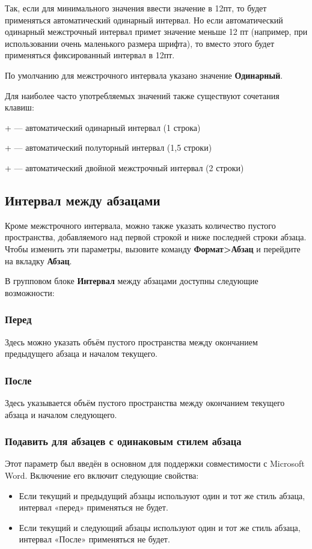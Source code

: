 ﻿\documentclass[a4paper,10pt]{article}
\begin{document}
\begin{itemize}
Так, если для минимального значения ввести значение в 12пт, то будет применяться автоматический одинарный интервал. Но если автоматический одинарный межстрочный интервал примет значение меньше 12 пт (например, при использовании очень маленького размера шрифта), то вместо этого будет применяться фиксированный интервал в 12пт.
\end{itemize}

По умолчанию для межстрочного интервала указано значение \textbf{Одинарный}.

Для наиболее часто употребляемых значений также существуют сочетания клавиш:

+ — автоматический одинарный интервал (1 строка)

+ — автоматический полуторный интервал (1,5 строки)

+ — автоматический двойной межстрочный интервал (2 строки)

\subsection{Интервал между абзацами}
Кроме межстрочного интервала, можно также указать количество пустого пространства, добавляемого над первой строкой и ниже последней строки абзаца.  
Чтобы изменить эти параметры, вызовите команду \textbf{Формат>Абзац} и перейдите на вкладку \textbf{Абзац}.

В групповом блоке \textbf{Интервал} между абзацами доступны следующие возможности: 

\subsubsection{Перед}
Здесь можно указать объём пустого пространства между окончанием предыдущего абзаца и началом текущего. 

\subsubsection{После}
Здесь указывается объём пустого пространства между окончанием текущего абзаца и началом следующего. 

\subsubsection{Подавить для абзацев с одинаковым стилем абзаца}
Этот параметр был введён в основном для поддержки совместимости с Microsoft Word. Включение его включит следующие свойства:
\begin{itemize}
 \item Если текущий и предыдущий абзацы используют один и тот же стиль абзаца, интервал «перед» применяться не будет.
 \item Если текущий и следующий абзацы используют один и тот же стиль абзаца, интервал «После» применяться не будет.
 \end{itemize}
 
\end{document}
